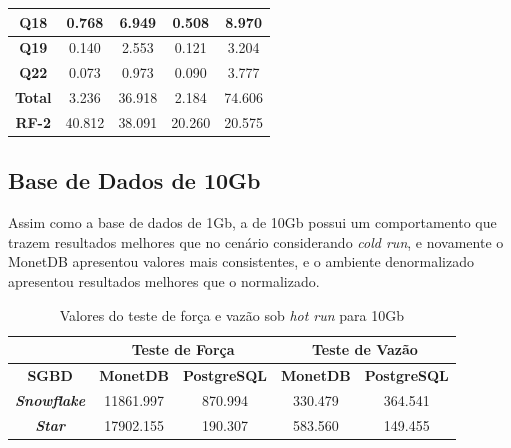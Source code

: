 \begin{table}[htpb]
\begin{tabular}{|c|c|c|c|c|}
        \textbf{Q18}   & 0.768             & 6.949               & 0.508            & 8.970               \\ \hline
        \textbf{Q19}   & 0.140             & 2.553               & 0.121            & 3.204               \\ \hline
        \textbf{Q22}   & 0.073             & 0.973               & 0.090            & 3.777               \\ \hline
        \textbf{Total} & 3.236             & 36.918              & 2.184            & 74.606              \\ \hline
        \textbf{RF-2}  & 40.812            & 38.091              & 20.260           & 20.575              \\ \hline
        \end{tabular}
        \end{table}



\subsection{Base de Dados de 10Gb}

Assim como a base de dados de 1Gb, a de 10Gb possui um comportamento que trazem resultados melhores que no cenário considerando \textit{cold run}, e novamente o MonetDB apresentou valores mais consistentes, e o ambiente denormalizado apresentou resultados melhores que o normalizado.

\begin{table}[htpb]
        \centering
        \caption{Valores do teste de força e vazão sob \textit{hot run} para 10Gb}
        \label{tab:forca_vazao_hot_10}
        \begin{tabular}{|c|c|c|c|c|}
        \hline
        & \multicolumn{2}{c|}{\textbf{Teste de Força}} & \multicolumn{2}{c|}{\textbf{Teste de Vazão}} \\ \hline
        \textbf{SGBD}               & \textbf{MonetDB}    & \textbf{PostgreSQL}    & \textbf{MonetDB}    & \textbf{PostgreSQL}    \\ \hline
        \textit{\textbf{Snowflake}} & 11861.997           & 870.994                & 330.479             & 364.541                \\ \hline
        \textit{\textbf{Star}}      & 17902.155           & 190.307                & 583.560             & 149.455                \\ \hline
        \end{tabular}
\end{table}

